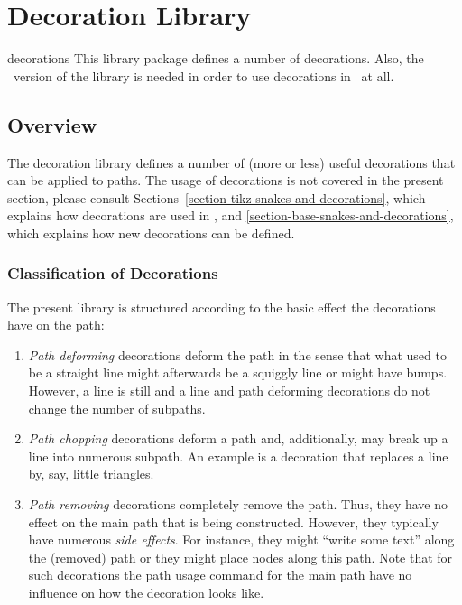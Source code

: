 %
%
%

\section{Decoration Library}
\label{section-library-decorations}

\begin{pgflibrary}{decorations}
  This library package defines a number of decorations. Also, the
  \tikzname\ version of the library is needed in order to use
  decorations in \tikzname\ at all.
\end{pgflibrary}


\subsection{Overview}

The decoration library defines a number of (more or less) useful
decorations that can be applied to paths. The usage of decorations is
not covered in the present section, please consult 
Sections~\ref{section-tikz-snakes-and-decorations}, which explains how
decorations are used in \tikzname, and
\ref{section-base-snakes-and-decorations}, which  explains how new
decorations can be defined. 

\subsubsection{Classification of Decorations}

The present library is structured according to the basic effect the
decorations have on the path:
\begin{enumerate}
\item \emph{Path deforming} decorations deform the path in the sense
  that what used to be a straight  line might afterwards be a squiggly
  line or might have bumps. However, a line is still and a line and
  path deforming decorations do not change the number of subpaths.
\item \emph{Path chopping} decorations deform a path and,
  additionally, may break up a line into numerous subpath. An example
  is a decoration that replaces a line by, say, little triangles.
\item \emph{Path removing} decorations completely remove the
  path. Thus, they have no effect on the main path that is being
  constructed. However, they typically have numerous \emph{side
    effects}. For instance, they might ``write some text'' along the
  (removed) path or they might place nodes along this path. Note that
  for such decorations the path usage command for the main path have
  no influence on how the decoration looks like.
\end{enumerate}


